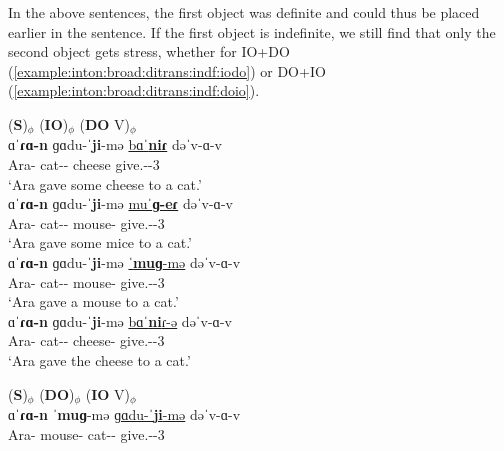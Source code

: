 In the above sentences, the first object was definite and could thus be placed earlier in the sentence. If the first object is indefinite,    we still find that only the second object gets stress, whether for IO+DO (\ref{example:inton:broad:ditrans:indf:iodo}) or DO+IO (\ref{example:inton:broad:ditrans:indf:doio}). 

\begin{exe}
	\ex \label{example:inton:broad:ditrans:indf:iodo}\begin{xlist}
		\ex \glll (\textbf{S})$_\phi$ (\textbf{IO})$_\phi$ (\textbf{DO} V)$_\phi$ \\
		ɑˈ\textbf{ɾɑ-n} ɡɑdu-ˈ\textbf{ji}-mə \underline{bɑˈ\textbf{niɾ}}  dəˈv-ɑ-v \\
		Ara-{} cat-{\dat}-{\indf} cheese give.{\aorperf}-{\pst}-3{\sg}  \\
		\trans `Ara gave some cheese to a cat.'
		\\ 
		\ex \gll ɑˈ\textbf{ɾɑ-n} ɡɑdu-ˈ\textbf{ji}-mə \underline{muˈ\textbf{ɡ-eɾ}}  dəˈv-ɑ-v \\
		Ara-{} cat-{\dat}-{\indf} mouse-{\pl} give.{\aorperf}-{\pst}-3{\sg}  \\
		\trans `Ara gave some mice   to a cat.'
		\\ 
		\ex \gll ɑˈ\textbf{ɾɑ-n} ɡɑdu-ˈ\textbf{ji}-mə \underline{ˈ\textbf{muɡ}-mə}  dəˈv-ɑ-v \\
		Ara-{} cat-{\dat}-{\indf} mouse-{\indf} give.{\aorperf}-{\pst}-3{\sg}  \\
		\trans `Ara gave a mouse   to a cat.'
		\\ 
		\ex \gll ɑˈ\textbf{ɾɑ-n} ɡɑdu-ˈ\textbf{ji}-mə \underline{bɑˈ\textbf{ni}ɾ-ə}  dəˈv-ɑ-v \\
		Ara-{} cat-{\dat}-{\indf} cheese-{} give.{\aorperf}-{\pst}-3{\sg}  \\
		\trans `Ara gave the cheese   to a cat.'
		\\ 
	\end{xlist}
	\ex \label{example:inton:broad:ditrans:indf:doio}\begin{xlist}
		\ex \glll (\textbf{S})$_\phi$ (\textbf{DO})$_\phi$ (\textbf{IO} V)$_\phi$ \\
		ɑˈ\textbf{ɾɑ-n}  {ˈ\textbf{muɡ}-mə} \underline{ɡɑdu-ˈ\textbf{ji}-mə}  dəˈv-ɑ-v \\
		Ara-{} mouse-{\indf} cat-{\dat}-{\indf} give.{\aorperf}-{\pst}-3{\sg}  \\

\end{xlist}
\end{exe}
